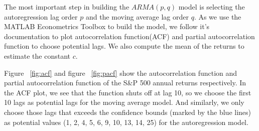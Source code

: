 \documentclass{article}
\begin{document}
The most important step in building the $ARMA(p, q)$ model is selecting the autoregression lag order $p$ and the moving average lag order $q$. As we use the MATLAB Econometrics Toolbox to build the model, we follow it's documentation\cite{lags} to plot autocorrelation function(ACF) and partial autocorrelation function to choose potential lags. We also compute the mean of the returns to estimate the constant $c$.

Figure ~\ref{fig:acf} and figure ~\ref{fig:pacf} show the autocorrelation function and partial autocorrelation function of the S\&P 500 annual returns respectively. In the ACF plot, we see that the function shuts off at lag 10, so we choose the first 10 lags as potential lags for the moving average model. And similarly, we only choose those lags that exceeds the confidence bounds (marked by the blue lines) as potential values (1, 2, 4, 5, 6, 9, 10, 13, 14, 25) for the autoregression model.
\end{document}
